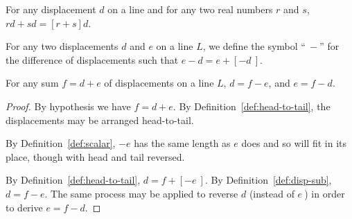 \begin{center}
\end{center}

\begin{theorem}
   For any displacement $d$ on a line and for any two real numbers $r$ and $s$,
   $r d + s d = [r + s] d$.
\label{theorem:disp-dist}
\end{theorem}

\begin{definition}
   For any two displacements $d$ and $e$ on a line $L$, we define the symbol
   ``$\:-$'' for the difference of displacements such that $e - d = e +
   [-d\:]$.
\label{def:disp-sub}
\end{definition}

\begin{theorem}
   For any sum $f = d + e$ of displacements on a line $L$, $d = f - e$, and $e
   = f - d$.
   \begin{proof}
      By hypothesis we have $f = d + e$. By Definition~\ref{def:head-to-tail},
      the displacements may be arranged head-to-tail.
      \begin{center}
      \end{center}
      By Definition~\ref{def:scalar}, $-e$ has the same length as $e$ does and
      so will fit in its place, though with head and tail reversed.
      \begin{center}
      \end{center}
      By Definition~\ref{def:head-to-tail}, $d = f + [-e\:]$.  By
      Definition~\ref{def:disp-sub}, $d = f - e$.  The same process may be
      applied to reverse $d$ (instead of $e\:$) in order to derive $e = f - d$.
   \end{proof}
\end{theorem}

